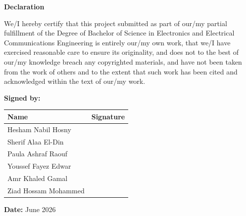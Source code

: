 \thispagestyle{empty}

\begin{center}
    \Large\textbf{Declaration}
\end{center}

\vspace{1cm}

We/I hereby certify that this project submitted as part of our/my partial fulfillment of the 
Degree of Bachelor of Science in Electronics and Electrical Communications Engineering is 
entirely our/my own work, that we/I have exercised reasonable care to ensure its originality, 
and does not to the best of our/my knowledge breach any copyrighted materials, and have not 
been taken from the work of others and to the extent that such work has been cited and 
acknowledged within the text of our/my work.

\vspace{2cm}

\textbf{Signed by:}

\vspace{0.5cm}

\begin{table}[h]
\centering
\renewcommand{\arraystretch}{1}
\begin{tabular}{|>{\centering\arraybackslash}m{}|>{\centering\arraybackslash}m{}|}
    \hline
    \textbf{Name} & \textbf{Signature} \\
    \hline
    \rule[-0.6cm]{0pt}{1.5cm} Hesham Nabil Hosny   & \\
    \hline
    \rule[-0.6cm]{0pt}{1.5cm} Sherif Alaa El-Din   & \\
    \hline
    \rule[-0.6cm]{0pt}{1.5cm} Paula Ashraf Raouf   & \\
    \hline
    \rule[-0.6cm]{0pt}{1.5cm} Youssef Fayez Edwar  & \\
    \hline
    \rule[-0.6cm]{0pt}{1.5cm} Amr Khaled Gamal     & \\
    \hline
    \rule[-0.6cm]{0pt}{1.5cm} Ziad Hossam Mohammed & \\
    \hline
\end{tabular}
\end{table}

\vspace{1cm}

\textbf{Date:} June 2026